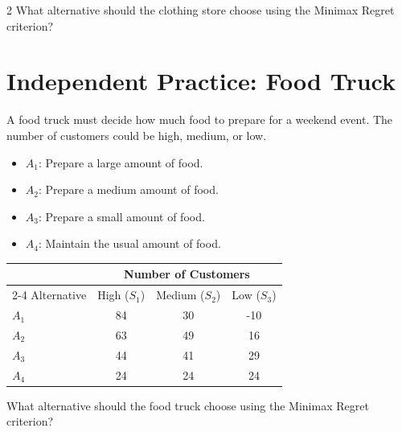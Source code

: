 \begin{multicols}{2}
	What alternative should the clothing store choose using the Minimax Regret criterion?
	
	
	\section{Independent Practice: Food Truck}
	
	A food truck must decide how much food to prepare for a weekend event.
	The number of customers could be high, medium, or low.
	\begin{itemize}
		\item $A_1$: Prepare a large amount of food.
		\item $A_2$: Prepare a medium amount of food.
		\item $A_3$: Prepare a small amount of food.
		\item $A_4$: Maintain the usual amount of food.
	\end{itemize}
	\begin{center}
		\renewcommand{\arraystretch}{1.3}
		\small
		\begin{tabular}{lccc}
			\toprule
			& \multicolumn{3}{c}{Number of Customers} \\
			\cmidrule(lr){2-4}
			Alternative & High ($S_1$) & Medium ($S_2$) & Low ($S_3$) \\
			\midrule
			$A_1$ & 84 & 30 & -10 \\
			$A_2$ & 63 & 49 & 16 \\
			$A_3$ & 44 & 41 & 29 \\
			$A_4$ & 24 & 24 & 24 \\
			\bottomrule
		\end{tabular}
	\end{center}
	
	What alternative should the food truck choose using the Minimax Regret criterion?
		
	\end{multicols}
	
